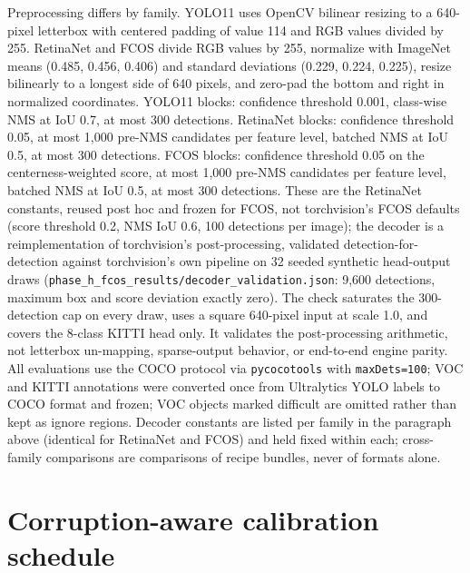 \documentclass[10pt]{article}
\begin{document}
Preprocessing differs by family. YOLO11 uses OpenCV bilinear resizing to a
640-pixel letterbox with centered padding of value 114 and RGB values divided
by 255. RetinaNet and FCOS divide RGB values by 255, normalize with ImageNet
means (0.485, 0.456, 0.406) and standard deviations (0.229, 0.224, 0.225),
resize bilinearly to a longest side of 640 pixels, and zero-pad the bottom
and right in normalized coordinates.
YOLO11 blocks: confidence threshold 0.001,
class-wise NMS at IoU 0.7, at most 300 detections. RetinaNet blocks:
confidence threshold 0.05, at most 1,000 pre-NMS candidates per feature level,
batched NMS at IoU 0.5, at most 300 detections. FCOS blocks: confidence threshold
0.05 on the centerness-weighted score, at most 1,000 pre-NMS candidates per
feature level, batched NMS at IoU 0.5, at most 300 detections. These are
the RetinaNet constants, reused post hoc and frozen for FCOS, not
torchvision's FCOS defaults
(score threshold 0.2, NMS IoU 0.6, 100 detections per image); the decoder is
a reimplementation of torchvision's post-processing, validated detection-for-detection
against torchvision's own pipeline on 32 seeded synthetic head-output
draws
(\texttt{phase\_h\_fcos\_results/decoder\_validation.json}: 9,600
detections, maximum box and score deviation exactly zero). The check
saturates the 300-detection cap on every draw, uses a square 640-pixel
input at scale 1.0, and covers the 8-class KITTI head only. It validates
the post-processing arithmetic, not letterbox un-mapping, sparse-output
behavior, or end-to-end engine parity. All evaluations use the COCO protocol via
\texttt{pycocotools} with \texttt{maxDets=100}; VOC and KITTI annotations were
converted once from Ultralytics YOLO labels to COCO format and frozen; VOC objects marked difficult are omitted rather than kept as ignore regions. Decoder constants are listed per family in
the paragraph above (identical for RetinaNet and FCOS) and held fixed
within each; cross-family comparisons are
comparisons of recipe bundles, never of formats alone.

\section{Corruption-aware calibration schedule}
\end{document}
